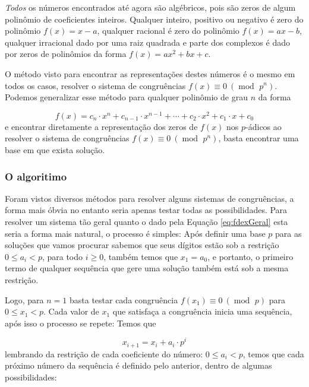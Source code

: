 \documentclass{report}
\DeclareMathOperator{\modulo}{mod \ }
\theoremstyle{definition}
\begin{document}
\emph{Todos} os números encontrados até agora são algébricos, pois são zeros de algum polinômio de coeficientes inteiros. Qualquer inteiro, positivo ou negativo é zero do polinômio $f(x) = x-a$, qualquer racional é zero do polinômio $f(x) = ax-b$, qualquer irracional dado por uma raiz quadrada e parte dos complexos é dado por zeros de polinômios da forma $f(x) = ax^2+bx+c$. 

O método visto para encontrar as representações destes números é o mesmo em todos os casos, resolver o sistema de congruências $f(x) \equiv 0 \ (\modulo p^n)$. Podemos generalizar esse método para qualquer polinômio de grau $n$ da forma

\begin{equation}\label{eq:fdexGeral}
    f(x) = c_n \cdot x^n + c_{n-1} \cdot x^{n-1} + \cdots + c_2 \cdot x^2 + c_1 \cdot x + c_0
\end{equation}
e encontrar diretamente a representação dos zeros de $f(x)$ nos $p$-ádicos ao resolver o sistema de congruências $f(x) \equiv 0 \ (\modulo p^n)$, basta encontrar uma base em que exista solução. 

\subsubsection*{O algoritimo}

Foram vistos diversos métodos para resolver alguns sistemas de congruências, a forma mais óbvia no entanto seria apenas testar todas as possibilidades. Para resolver um sistema tão geral quanto o dado pela Equação \ref{eq:fdexGeral} esta seria a forma mais natural, o processo é simples: Após definir uma base $p$ para as soluções que vamos procurar sabemos que seus dígitos estão sob a restrição $0 \leq a_i < p$, para todo $i \geq 0$, também temos que $x_1 = a_0$, e portanto, o primeiro termo de qualquer sequência que gere uma solução também está sob a mesma restrição.

Logo, para $n = 1$ basta testar cada congruência $f(x_1) \equiv 0 \ (\modulo p)$ para $0 \leq x_1 < p$. Cada valor de $x_1$ que satisfaça a congruência inicia uma sequência, após isso o processo se repete: Temos que

\begin{equation}
    x_{i+1} = x_i + a_i \cdot p^i
\end{equation}
lembrando da restrição de cada coeficiente do número: $0 \leq a_i < p$, temos que cada próximo número da sequência é definido pelo anterior, dentro de algumas possibilidades:
\end{document}
